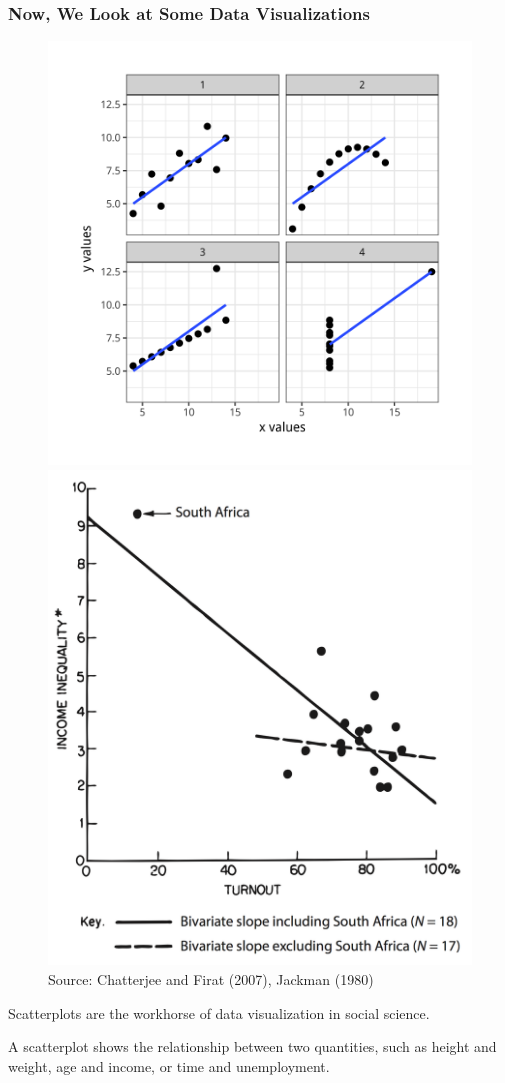 \documentclass[11pt]{beamer}
\begin{document}
\begin{frame}

	\frametitle{\bfseries Now, We Look at Some Data Visualizations}
	\begin{figure}
		\vspace{-.5em}
		\includegraphics[width=0.5\linewidth]{Figure/anscombe-1}
		\includegraphics[width=0.4\linewidth]{Figure/jackman-outlier}
		\\
		\tiny{Source: Chatterjee and Firat (2007), Jackman (1980)}
		\label{fig:anscombe-1}
	\end{figure}
	\begin{itemize}
		\footnotesize{
		\item Scatterplots are the workhorse of data visualization in social science.
		\item A scatterplot shows the relationship between two quantities, such as height and weight, age and income, or time and unemployment. }
	\end{itemize}
\end{frame}
\end{document}
